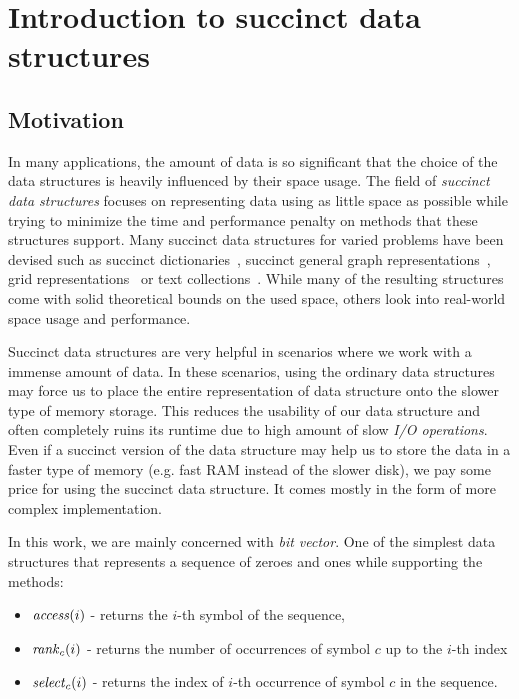 \chapter{Introduction to succinct data structures}
\label{kap:kap1}


\section{Motivation}

In many applications, the amount of data is so significant that the choice of
the data structures is heavily influenced by their space usage. The field
of \textit{succinct data structures} focuses on representing data using as little
space as possible while trying to minimize the time and performance penalty on methods
that these structures support. Many succinct data structures for varied problems
have been devised such as succinct dictionaries~\citep{raman2007succinct},
succinct general graph representations~\citep{farzan2013succinct}, grid
representations~\citep{chazelle1988functional} or text collections~\citep{ferragina2000opportunistic}.
While many of the resulting structures come with solid theoretical bounds on the used space,
others look into real-world space usage and performance.


Succinct data structures are very helpful in scenarios where we work with a immense amount
of data. In these scenarios, using the ordinary data structures may force us to place
the entire representation of data structure onto the slower type of memory storage. This
reduces the usability of our data structure and often completely ruins its runtime due to
high amount of slow \textit{I/O operations}. Even if a succinct version of the data structure
may help us to store the data in a faster type of memory (e.g. fast RAM instead of the slower disk),
we pay some price for using the succinct data structure. It comes mostly in the form of more
complex implementation.

In this work, we are mainly concerned with \textit{bit vector}. One of the simplest
data structures that represents a sequence of zeroes and ones while supporting the
methods:
\begin{itemize}
\item $\mathit{access}(i)$ - returns the $i$-th symbol of the sequence,
\item $\mathit{rank}_c(i)$ - returns the number of occurrences of symbol $c$ up to the $i$-th index
\item $\mathit{select}_c(i)$ - returns the index of $i$-th occurrence of symbol $c$ in the sequence.
\end{itemize}

